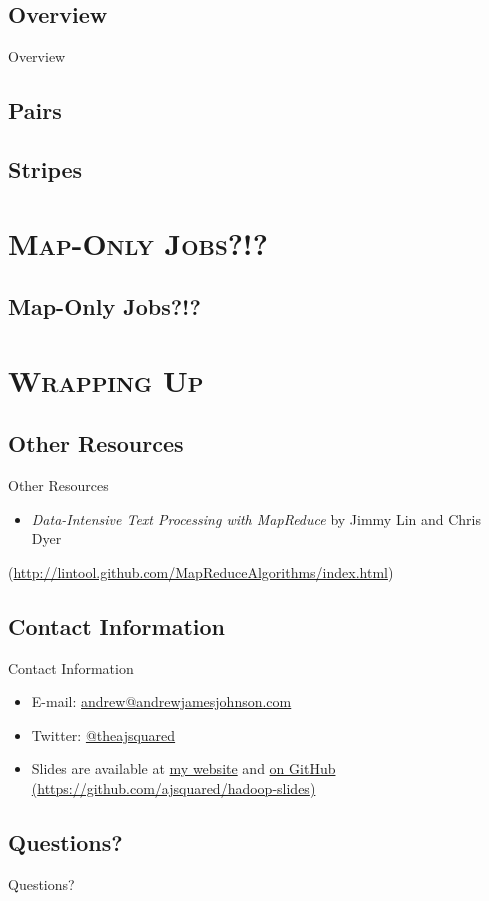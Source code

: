 \documentclass[xcolor=x11names,compress]{beamer}
\renewcommand{\(}{\begin{columns}}
\renewcommand{\)}{\end{columns}}
\newcommand{\<}[1]{\begin{column}{#1}}
\renewcommand{\>}{\end{column}}
\begin{document}
\subsection{Overview}
\begin{frame}{Overview}
  
\end{frame}

\subsection{Pairs}

\subsection{Stripes}

\section{\scshape Map-Only Jobs?!?}

\subsection{Map-Only Jobs?!?}

\section{\scshape Wrapping Up}

\subsection{Other Resources}
\begin{frame}{Other Resources}
  \begin{itemize}
  \item \emph{Data-Intensive Text Processing with MapReduce} by Jimmy
    Lin and Chris Dyer
  \end{itemize}
  (\url{http://lintool.github.com/MapReduceAlgorithms/index.html})
\end{frame}

\subsection{Contact Information}
\begin{frame}{Contact Information}
  \begin{itemize}
  \item E-mail: \href{mailto:andrew@andrewjamesjohnson.com}{andrew@andrewjamesjohnson.com}
  \item Twitter: \href{http://twitter.com/theajsquared}{@theajsquared}
  \item Slides are available at \href{}{my website} and
    \href{https://github.com/ajsquared/hadoop-slides}{on GitHub (\url{https://github.com/ajsquared/hadoop-slides})}
  \end{itemize}
\end{frame}

\subsection{Questions?}
\begin{frame}
  \Huge
  Questions?
\end{frame}
\end{document}
